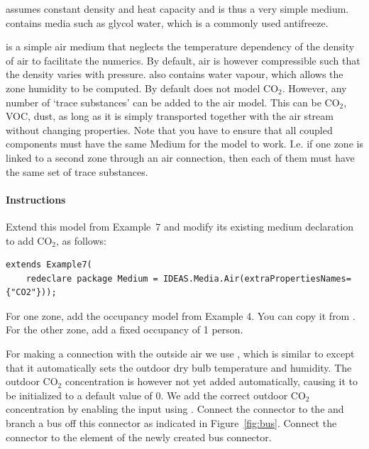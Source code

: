 \documentclass[10pt,a4paper]{article}
\begin{document}
 assumes constant density and heat capacity and is thus
a very simple medium.
 contains media such as glycol water,
which is a commonly used antifreeze.

 is a simple air medium that 
neglects the temperature dependency of the density of air to
facilitate the numerics. 
By default, air is however compressible such that the density
varies with pressure.
 also contains water vapour,
which allows the zone humidity to be computed.
By default  does not model CO$_2$.
However, any number of `trace substances' can be added to the air model.
This can be CO$_2$, VOC, dust, as long as it is simply transported together
with the air stream without changing properties.
Note that you have to ensure that all coupled components must have the same Medium
for the model to work. I.e. if one zone is linked to a second zone through an air connection,
then each of them must have the same set of trace substances.

\paragraph{Instructions}
Extend this model from Example~7 and modify its existing medium declaration
to add CO$_2$, as follows:
\begin{verbatim}
extends Example7(
    redeclare package Medium = IDEAS.Media.Air(extraPropertiesNames={"CO2"}));
\end{verbatim}
For one zone, add the occupancy model from Example 4. 
You can copy it from .
For the other zone, add a fixed occupancy of 1 person.

For making a connection with the outside air we use ,
which is similar to  except that it 
automatically sets the outdoor dry bulb temperature and humidity.
The outdoor CO$_2$ concentration is however not yet added automatically,
causing it to be initialized to a default value of 0.
We add the correct outdoor CO$_2$ concentration by
enabling the input  using .
Connect the connector  to the 
and branch a bus off this connector as indicated in Figure~\ref{fig:bus}.
Connect the connector  to the element  of
the newly created bus connector.\\
\end{document}
